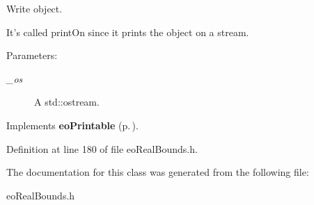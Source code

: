 Write object. 

It's called print\-On since it prints the object on a stream. \begin{Desc}
\item[Parameters:]
\begin{description}
\item[{\em \_\-os}]A std::ostream. \end{description}
\end{Desc}


Implements {\bf eo\-Printable} {\rm (p.\,\pageref{classeo_printable_a1})}.

Definition at line 180 of file eo\-Real\-Bounds.h.

The documentation for this class was generated from the following file:\begin{CompactItemize}
\item 
eo\-Real\-Bounds.h\end{CompactItemize}
